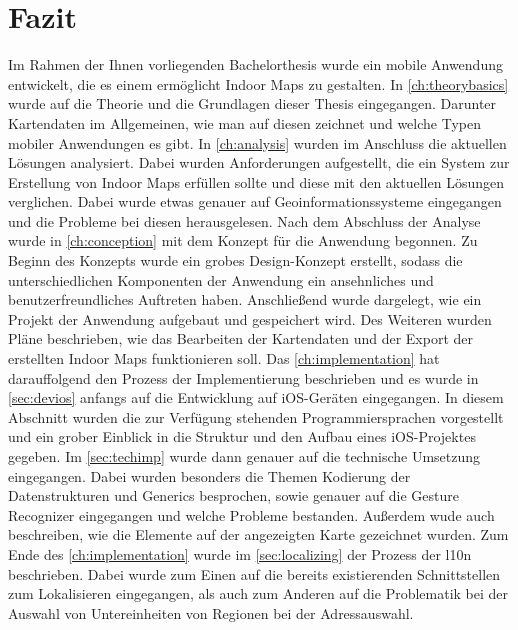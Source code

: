 \chapter{Fazit}
\label{ch:conclusion}
Im Rahmen der Ihnen vorliegenden Bachelorthesis wurde ein mobile Anwendung entwickelt, die es einem ermöglicht Indoor Maps zu gestalten.
In \autoref{ch:theorybasics} wurde auf die Theorie und die Grundlagen dieser Thesis eingegangen.
Darunter Kartendaten im Allgemeinen, wie man auf diesen zeichnet und welche Typen mobiler Anwendungen es gibt.\pbreak%
%
In \autoref{ch:analysis} wurden im Anschluss die aktuellen Lösungen analysiert.
Dabei wurden Anforderungen aufgestellt, die ein System zur Erstellung von Indoor Maps erfüllen sollte und diese mit den aktuellen Lösungen verglichen.
Dabei wurde etwas genauer auf Geoinformationssysteme eingegangen und die Probleme bei diesen herausgelesen.\pbreak%
%
Nach dem Abschluss der Analyse wurde in \autoref{ch:conception} mit dem Konzept für die Anwendung begonnen.
Zu Beginn des Konzepts wurde ein grobes Design-Konzept erstellt, sodass die unterschiedlichen Komponenten der Anwendung ein ansehnliches und benutzerfreundliches Auftreten haben.
Anschließend wurde dargelegt, wie ein Projekt der Anwendung aufgebaut und gespeichert wird.
Des Weiteren wurden Pläne beschrieben, wie das Bearbeiten der Kartendaten und der Export der erstellten Indoor Maps funktionieren soll.\pbreak%
%
Das \autoref{ch:implementation} hat darauffolgend den Prozess der Implementierung beschrieben und es wurde in \autoref{sec:devios} anfangs auf die Entwicklung auf iOS-Geräten eingegangen.
In diesem Abschnitt wurden die zur Verfügung stehenden Programmiersprachen vorgestellt und ein grober Einblick in die Struktur und den Aufbau eines iOS-Projektes gegeben.
Im \autoref{sec:techimp} wurde dann genauer auf die technische Umsetzung eingegangen.
Dabei wurden besonders die Themen Kodierung der Datenstrukturen und Generics besprochen, sowie genauer auf die Gesture Recognizer eingegangen und welche Probleme bestanden.
Außerdem wude auch beschreiben, wie die Elemente auf der angezeigten Karte gezeichnet wurden.\pbreak%
%
Zum Ende des \autoref{ch:implementation} wurde im \autoref{sec:localizing} der Prozess der \Gls{l10n} beschrieben.
Dabei wurde zum Einen auf die bereits existierenden Schnittstellen zum Lokalisieren eingegangen, als auch zum Anderen auf die Problematik bei der Auswahl von Untereinheiten von Regionen bei der Adressauswahl.

